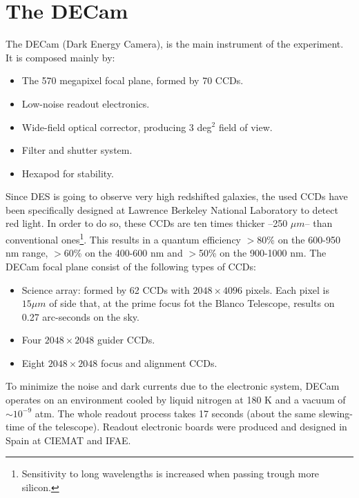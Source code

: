 \section{The DECam}
The DECam (Dark Energy Camera), is the main instrument of the experiment. It is composed mainly by:
\begin{itemize}
	\item The 570 megapixel focal plane, formed by 70 CCDs.
    \item Low-noise readout electronics.
    \item Wide-field optical corrector, producing 3 deg$^2$ field of view.
    \item Filter and shutter system.
    \item Hexapod for stability.   
\end{itemize}
Since DES is going to observe very high redshifted galaxies, the used CCDs have been specifically designed at Lawrence Berkeley National Laboratory to detect red light. In order to do so, these CCDs are ten times thicker --250 $\mu m$-- than conventional ones\footnote{Sensitivity to long wavelengths is increased when passing trough more silicon.}. This results in a quantum efficiency $>$80\% on the 600-950 nm range, $>$60\% on the 400-600 nm and $>$50\% on the 900-1000 nm. The DECam focal plane consist of the following types of CCDs:
\begin{itemize}
\item Science array: formed by 62 CCDs with $2048\times 4096$ pixels. Each pixel is $15\mu m$ of side that, at the prime focus fot the  Blanco Telescope, results on 0.27 arc-seconds on the sky.
\item Four $2048\times2048$ guider CCDs.
\item Eight $2048\times 2048$ focus and alignment CCDs.
\end{itemize}
To minimize the noise and dark currents due to the electronic system, DECam operates on an environment cooled by liquid nitrogen at 180 K and a vacuum of $\sim 10^{-9}$ atm. The whole readout process takes 17 seconds (about the same slewing-time of the telescope). Readout electronic boards were produced and designed in Spain at CIEMAT and IFAE.
